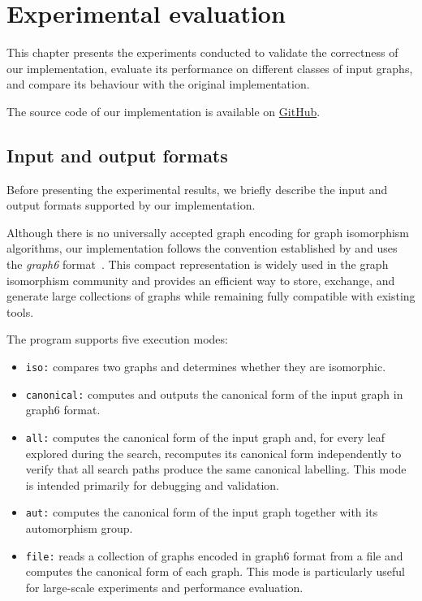 \chapter{Experimental evaluation}

This chapter presents the experiments conducted to validate the correctness of our implementation, evaluate its performance on different classes of input graphs, and compare its behaviour with the original \Naut{} implementation.

The source code of our implementation is available on \href{https://github.com/roro174/nauty.git}{GitHub}.

\section{Input and output formats}

Before presenting the experimental results, we briefly describe the input and output formats supported by our implementation.

Although there is no universally accepted graph encoding for graph isomorphism algorithms, our implementation follows the convention established by \Naut{} and uses the \emph{graph6} format~\cite{mckay_graph6_formats}. This compact representation is widely used in the graph isomorphism community and provides an efficient way to store, exchange, and generate large collections of graphs while remaining fully compatible with existing tools.

The program supports five execution modes:

\begin{itemize}
    \item \texttt{iso:}\label{mode:iso} compares two graphs and determines whether they are isomorphic.
    
    \item \texttt{canonical:}\label{mode:canonical} computes and outputs the canonical form of the input graph in graph6 format.
    
    \item \texttt{all:}\label{mode:all} computes the canonical form of the input graph and, for every leaf explored during the search, recomputes its canonical form independently to verify that all search paths produce the same canonical labelling. This mode is intended primarily for debugging and validation.
    
    \item \texttt{aut:}\label{mode:aut} computes the canonical form of the input graph together with its automorphism group.
    
    \item \texttt{file:}\label{mode:file} reads a collection of graphs encoded in graph6 format from a file and computes the canonical form of each graph. This mode is particularly useful for large-scale experiments and performance evaluation.
\end{itemize}


